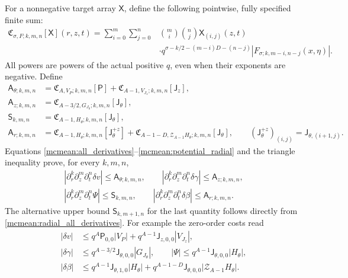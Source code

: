 For a nonnegative target array \(\mathsf X\), define the following
pointwise, fully specified finite sum:
\begin{equation}\label{mcmean:cost_operator}
\begin{split}
 \mathfrak C_{\sigma,F;k,m,n}[\mathsf X](r,z,t)
  =\sum_{i=0}^m\sum_{j=0}^n&\binom mi\binom nj\mathsf X_{(i,j)}(z,t)\\
 &\cdot q^{\sigma-k/2-(m-i)D-(n-j)}
       |F_{\sigma;k,m-i,n-j}(x,\eta)|.
\end{split}
\end{equation}
All powers are powers of the actual positive \(q\), even when their
exponents are negative. Define
\begin{equation}\label{mcmean:velocity_arrays}
\begin{split}
 \mathsf A_{\theta;k,m,n}
    &=\mathfrak C_{A,V_P;k,m,n}[\mathsf P]
        +\mathfrak C_{A-1,V_{J_z};k,m,n}[\mathsf J_z],\\
 \mathsf A_{z;k,m,n}
    &=\mathfrak C_{A-3/2,G_{J_\theta};k,m,n}[\mathsf J_\theta],\\
 \mathsf S_{k,m,n}
    &=\mathfrak C_{A-1,H_\theta;k,m,n}[\mathsf J_\theta],\\
 \mathsf A_{r;k,m,n}
    &=\mathfrak C_{A-1,H_\theta;k,m,n}[\mathsf J_\theta^{+z}]
      +\mathfrak C_{A-1-D,\mathcal Z_{A-1}H_\theta;k,m,n}
                                                 [\mathsf J_\theta],
 \qquad (\mathsf J_\theta^{+z})_{(i,j)}=\mathsf J_{\theta,(i+1,j)}.
\end{split}
\end{equation}
Equations \eqref{mcmean:all_derivatives}--\eqref{mcmean:potential_radial}
and the triangle inequality prove, for every \(k,m,n\),
\begin{equation}\label{mcmean:velocity_bounds}
\begin{gathered}
 |\partial_r^k\partial_z^m\partial_t^n\delta v|
       \le\mathsf A_{\theta;k,m,n},\qquad
 |\partial_r^k\partial_z^m\partial_t^n\delta\gamma|
       \le\mathsf A_{z;k,m,n},\\
 |\partial_r^k\partial_z^m\partial_t^n\Psi|
       \le\mathsf S_{k,m,n},\qquad
 |\partial_r^k\partial_z^m\partial_t^n\delta\beta|
       \le\mathsf A_{r;k,m,n}.
\end{gathered}
\end{equation}
The alternative upper bound \(\mathsf S_{k,m+1,n}\) for the last
quantity follows directly from \eqref{mcmean:radial_all_derivatives}.
For example the zero-order costs read
\[
\begin{split}
 |\delta v|&\le q^A\mathsf P_{0,0}|V_P|
                    +q^{A-1}\mathsf J_{z,0,0}|V_{J_z}|,\\
 |\delta\gamma|&\le q^{A-3/2}\mathsf J_{\theta,0,0}|G_{J_\theta}|,
 \qquad |\Psi|\le q^{A-1}\mathsf J_{\theta,0,0}|H_\theta|,\\
 |\delta\beta|&\le q^{A-1}\mathsf J_{\theta,1,0}|H_\theta|
       +q^{A-1-D}\mathsf J_{\theta,0,0}|\mathcal Z_{A-1}H_\theta|.
\end{split}
\]
